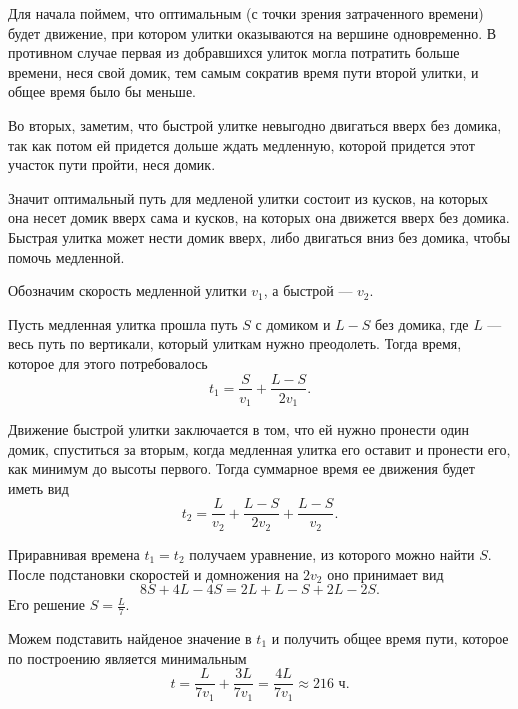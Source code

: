 Для начала поймем, что оптимальным (с точки зрения затраченного времени) будет движение, при котором улитки оказываются на вершине одновременно. В противном случае первая из добравшихся улиток могла потратить больше времени, неся свой домик, тем самым сократив время пути второй улитки, и общее время было бы меньше.

Во вторых, заметим, что быстрой улитке невыгодно двигаться вверх без домика, так как потом ей придется дольше ждать медленную, которой придется этот участок пути пройти, неся домик.

Значит оптимальный путь для медленой улитки состоит из кусков, на которых она несет домик вверх сама и кусков, на которых она движется вверх без домика. Быстрая улитка может нести домик вверх, либо двигаться вниз без домика, чтобы помочь медленной.

Обозначим скорость медленной улитки $v_1$, а быстрой --- $v_2$.

Пусть медленная улитка прошла путь $S$ с домиком и $L-S$ без домика, где $L$ --- весь путь по вертикали, который улиткам нужно преодолеть. Тогда время, которое для этого потребовалось
\begin{equation}
	t_1 = \frac{S}{v_1} + \frac{L-S}{2v_1}.
\end{equation}

Движение быстрой улитки заключается в том, что ей нужно пронести один домик, спуститься за вторым, когда медленная улитка его оставит и пронести его, как минимум до высоты первого. Тогда суммарное время ее движения будет иметь вид
\begin{equation}
	t_2 = \frac{L}{v_2} + \frac{L-S}{2v_2} + \frac{L-S}{v_2}.
\end{equation}

Приравнивая времена $t_1 = t_2$ получаем уравнение, из которого можно найти $S$. После подстановки скоростей и домножения на $2v_2$ оно принимает вид
\begin{equation}
	8S + 4L -4S = 2L + L - S +2L - 2S.
\end{equation}
Его решение $S = \frac{L}{7}$.

Можем подставить найденое значение в $t_1$ и получить общее время пути, которое по построению является минимальным
\begin{equation}
	t = \frac{L}{7v_1} + \frac{3L}{7v_1} = \frac{4L}{7v_1} \approx 216\text{ ч}.
\end{equation}


\ifgrade
\begin{grade-env}
\end{grade-env}
\fi
